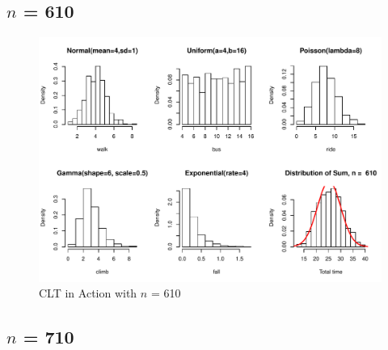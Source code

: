 \documentclass[11pt,letter]{article}\usepackage[]{graphicx}\usepackage[]{color}
\makeatletter
\def\maxwidth{ %
  \ifdim\Gin@nat@width>\linewidth
    \linewidth
  \else
    \Gin@nat@width
  \fi
}
\newenvironment{knitrout}{}{} %
\makeatother
\begin{document}
\subsection{$n$ = 610}

\begin{knitrout}
\color{fgcolor}\begin{figure}[h]

{\centering \includegraphics[width=\maxwidth]{figure/n-610-1} 

}

\caption[CLT in Action with ]{CLT in Action with $n$ = 610}\label{fig:n-610}
\end{figure}


\end{knitrout}
\newpage
\subsection{$n$ = 710}
\end{document}
